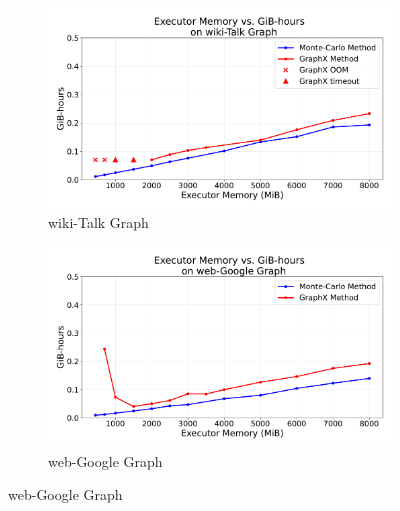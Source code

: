 \begin{figure}[H]
    \centering
    \begin{subfigure}[t]{0.5\linewidth}
        \centering
        \includegraphics[width=\linewidth]{images/plots/wiki-Talk/gbhrs_nodes_wiki_talk.pdf}
        \caption{wiki-Talk Graph}
        \label{fig:wikirun}
    \end{subfigure}\hfill
    \begin{subfigure}[t]{0.5\linewidth}
        \centering
        \includegraphics[width=\linewidth]{images/plots/web-Google/gbhrs_nodes_web_google.pdf}
        \caption{web-Google Graph}
        \label{fig:wikigibhrs}
    \end{subfigure}
\end{figure}


